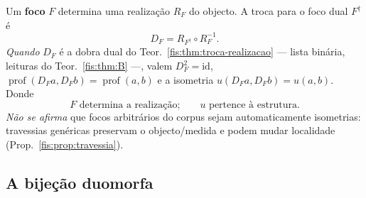 \documentclass[livro.tex]{subfiles}
\begin{document}
\begin{corolario}\label{fis:cor:foco}
Um \textbf{foco} $F$ determina uma realização $R_F$ do objecto. A troca para o
foco dual $F^{\dagger}$ é
\[
D_F=R_{F^{\dagger}}\circ R_F^{-1}.
\]
\emph{Quando} $D_F$ é a dobra dual do Teor.~\ref{fis:thm:troca-realizacao} ---
lista binária, leituras do Teor.~\ref{fis:thm:B} ---, valem $D_F^{2}=\mathrm{id}$,
$\operatorname{prof}(D_Fa,D_Fb)=\operatorname{prof}(a,b)$ e a isometria
$u(D_Fa,D_Fb)=u(a,b)$. Donde
\[
\boxed{\;F\text{ determina a realização;}\qquad u\text{ pertence à estrutura.}\;}
\]
\emph{Não se afirma} que focos arbitrários do corpus sejam automaticamente
isometrias: travessias genéricas preservam o objecto/medida e podem mudar
localidade (Prop.~\ref{fis:prop:travessia}).
\end{corolario}


\subsection*{A bijeção duomorfa}
\end{document}

